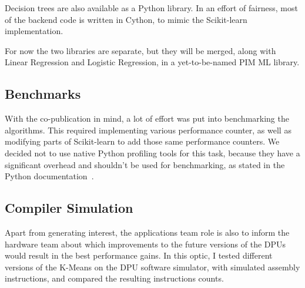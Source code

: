 Decision trees are also available as a Python library. In an effort of fairness, most of the backend code is written in Cython, to mimic the Scikit-learn implementation.

For now the two libraries are separate, but they will be merged, along with Linear Regression and Logistic Regression, in a yet-to-be-named PIM ML library.

\subsection{Benchmarks}

With the co-publication in mind, a lot of effort was put into benchmarking the algorithms. This required implementing various performance counter, as well as modifying parts of Scikit-learn to add those same performance counters. We decided not to use native Python profiling tools for this task, because they have a significant overhead and shouldn't be used for benchmarking, as stated in the Python documentation~\cite{10.5555/1593511}.

\subsection{Compiler Simulation}

Apart from generating interest, the applications team role is also to inform the hardware team about which improvements to the future versions of the DPUs would result in the best performance gains. In this optic, I tested different versions of the K-Means on the DPU software simulator, with simulated assembly instructions, and compared the resulting instructions counts.
